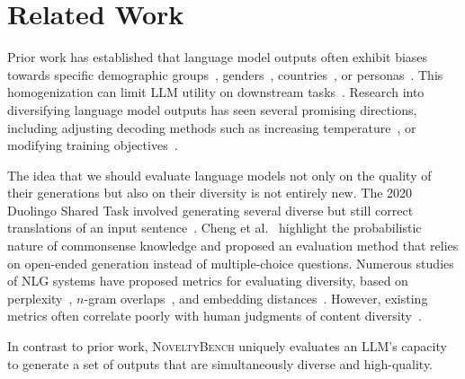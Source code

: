 
\section{Related Work}
\label{sec-related}
Prior work has established that language model outputs often exhibit biases towards specific demographic groups~\cite{santurkar2023}, genders~\cite{delarco2024}, countries~\cite{durmus2023}, or personas~\cite{giorgi2024}.
This homogenization can limit LLM utility on downstream tasks~\cite{agarwal2024,song2024}.
Research into diversifying language model outputs has seen several promising directions, including adjusting decoding methods such as increasing temperature~\cite{shurofry2024,peeperkorn2024}, or modifying training objectives~\cite{li2016diversity,zhang2024diffuse,li2024preserving,lanchantin2025}.

The idea that we should evaluate language models not only on the quality of their generations but also on their diversity is not entirely new.
The 2020 Duolingo Shared Task involved generating several diverse but still correct translations of an input sentence~\cite{mayhew2020}.
Cheng et al.~\cite{cheng2024} highlight the probabilistic nature of commonsense knowledge and proposed an evaluation method that relies on open-ended generation instead of multiple-choice questions.
Numerous studies of NLG systems have proposed metrics for evaluating diversity, based on perplexity~\cite{lewis2017,fan2018}, $n$-gram overlaps~\cite{zhu2018,shu2019,dusek2020}, and embedding distances~\cite{du2019}.
However, existing metrics often correlate poorly with human judgments of content diversity~\cite{tevet2021}.


In contrast to prior work, \textsc{NoveltyBench} uniquely evaluates an LLM's capacity to generate a set of outputs that are simultaneously diverse and high-quality.
